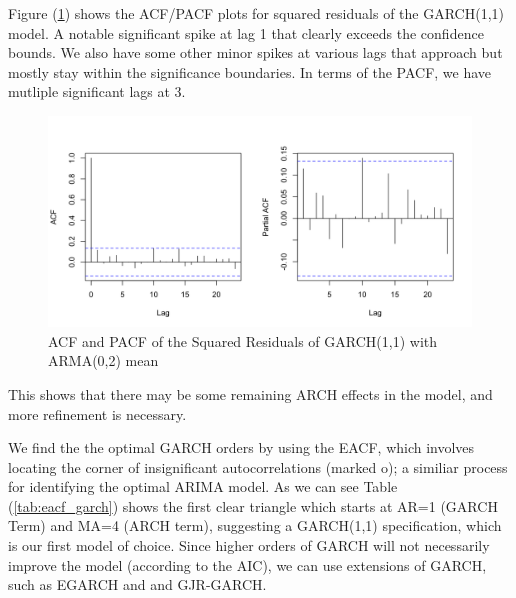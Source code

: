 Figure (\ref{fig:acf_pacf_squared_resid}) shows the ACF/PACF plots for squared residuals of the GARCH(1,1) model. A notable significant spike at lag 1 that clearly exceeds the confidence bounds. We also have some other minor spikes at various lags that approach but mostly stay within the significance boundaries. In terms of the PACF, we have mutliple significant lags at 3. 

\begin{figure}[!h]
	\centering
	\includegraphics[width=0.85\linewidth]{content/plots/acf_pacf_squared_resid.png}
	\caption{ACF and PACF of the Squared Residuals of GARCH(1,1) with ARMA(0,2) mean}
	\label{fig:acf_pacf_squared_resid}
\end{figure}

This shows that there may be some remaining ARCH effects in the model, and more refinement is necessary.

We find the the optimal GARCH orders by using the EACF, which involves  locating the corner of insignificant autocorrelations (marked o); a similiar process for identifying the optimal ARIMA model. As we can see Table (\ref{tab:eacf_garch}) shows the first clear triangle which starts at AR=1 (GARCH Term) and MA=4 (ARCH term), suggesting a GARCH(1,1) specification, which is our first model of choice. Since higher orders of GARCH will not necessarily improve the model (according to the AIC), we can use extensions of GARCH, such as EGARCH and and GJR-GARCH.


